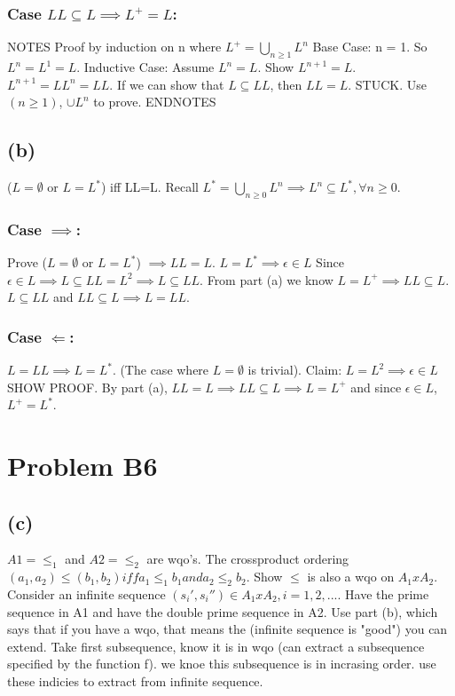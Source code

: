 \documentclass[12pt]{article}
\begin{document}
\subsubsection*{Case $LL \subseteq L \implies L^+ = L$:}
NOTES
\newline
Proof by induction on n where $L^+ = \bigcup\limits_{n\ge1} L^n$
Base Case: n = 1. So $L^n = L^1  = L$.
Inductive Case: Assume $L^n = L$.
Show $L^{n+1} =L$. 
\newline 
$L^{n+1} = LL^{n} = LL$. If we can show that $L \subseteq LL$, then 
$LL=L$.
STUCK. Use $(n \ge 1)$, $ \cup L^n$ to prove.
ENDNOTES

\subsection*{(b)}
($L=\emptyset$ or $L=L^*$) iff LL=L.
Recall $L^\ast = \bigcup\limits_{n \ge 0} L^n \implies L^n \subseteq L^\ast,
\forall n\ge 0$.
\newline
\subsubsection*{Case $\implies$:}
Prove ($L=\emptyset$ or $L=L^*$)
$\implies LL=L$. $L = L^\ast \implies {\epsilon } \in L$
Since ${\epsilon } \in L \implies L \subseteq LL = L^2 \implies L \subseteq LL$.
From part (a) we know $L=L^+ \implies LL \subseteq L$. 
$L \subseteq LL$ and $LL \subseteq L \implies L = LL$.

\subsubsection*{Case $\Longleftarrow$:} 
$L=LL \implies L = L^\ast$.
(The case where $L= \emptyset$ is trivial).
Claim: $L=L^2 \implies {\epsilon } \in L$ SHOW PROOF.
By part (a), $LL=L \implies LL \subseteq L \implies
L = L^+$ and since ${\epsilon } \in L$, $L^+=L^\ast$.

\section*{Problem B6}

\subsection*{(c)}
$ A1 = \le_1$ and $A2 = \le_2$ are wqo's.
The crossproduct ordering $(a_1,a_2) \le (b_1, b_2)
iff a_1 \le_1 b_1 and a_2 \le_2 b_2$.
Show $\le$ is also a wqo on $A_1 x A_2$.
Consider an infinite sequence $(s_i ' , s_i '') \in A_1 x A_2, i = 1,2,...$.
Have the prime sequence in A1 and have the double prime sequence in A2.
Use part (b), which says that if you have a wqo, that means the
(infinite sequence is "good") you can extend. Take first subsequence,
know it is in wqo (can extract a subsequence specified by the function f).
we knoe this subsequence is in incrasing order. use these indicies to extract
from infinite sequence.
\end{document}
